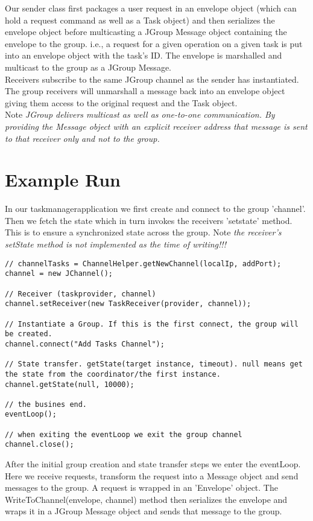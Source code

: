 Our sender class first packages a user request in an envelope object (which can hold a request command as well as a Task object) and then serializes the envelope object before multicasting a JGroup Message object containing the envelope to the group. i.e., a request for a given operation on a given task is put into an envelope object with the task's ID. The envelope is marshalled and multicast to the group as a JGroup Message.\\

Receivers subscribe to the same JGroup channel as the sender has instantiated. The group receivers will unmarshall a message back into an envelope object giving them access to the original request and the Task object. \\

Note \textit{JGroup delivers multicast as well as one-to-one communication. By providing the Message object with an explicit receiver address that message is sent to that receiver only and not to the group.}

\section{Example Run}
\label{jgroup_run}
In our taskmanagerapplication we first create and connect to the group 'channel'. Then we fetch the state which in turn invokes the receivers 'setstate' method. This is to ensure a synchronized state across the group. Note \textit{the receiver's setState method is not implemented as the time of writing!!!}   

\begin{lstlisting}[caption=group setup]
// channelTasks = ChannelHelper.getNewChannel(localIp, addPort);
channel = new JChannel();

// Receiver (taskprovider, channel) 
channel.setReceiver(new TaskReceiver(provider, channel));

// Instantiate a Group. If this is the first connect, the group will be created.
channel.connect("Add Tasks Channel");

// State transfer. getState(target instance, timeout). null means get the state from the coordinator/the first instance.        
channel.getState(null, 10000);

// the busines end.
eventLoop();

// when exiting the eventLoop we exit the group channel
channel.close();
\end{lstlisting}

After the initial group creation and state transfer steps we enter the eventLoop. Here we receive requests, transform the request 
into a Message object and send messages to the group. A request is wrapped in an 'Envelope' object. The WriteToChannel(envelope, channel) method then serializes the envelope and wraps it in a JGroup Message object and sends that message to the group.\\

